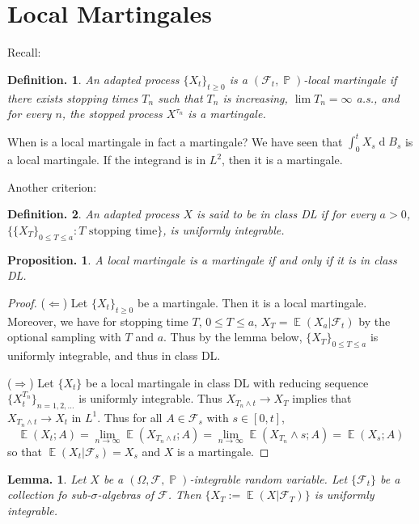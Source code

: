 \documentclass[11pt, a4paper]{memoir}
\newcommand{\impr}{{($\Longrightarrow$)\hspace{0.2cm}}}
\newcommand{\impl}{{($\Longleftarrow$)\hspace{0.2cm}}}
\theoremstyle{change}
\newtheorem{lemma}[theorem]{Lemma.}
\newtheorem{proposition}[theorem]{Proposition.}
\theoremstyle{plain}
\theoremstyle{nonumberplain}
\newtheorem{definition}{Definition.}
\newtheorem{proof}{Proof}
\DeclareMathOperator{\pr}{{\mathbb{P}}}
\DeclareMathOperator{\E}{{\mathbb{E}}}
\renewcommand{\d}[1]{\ensuremath{\operatorname{d}\!{#1}}}
\numberwithin{equation}{section}
\begin{document}
\section{Local Martingales}
Recall:
\begin{definition}
    An adapted process $\{X_t\}_{t\geq 0}$ is a $(\mathcal{F}_t,\pr)$-local martingale if there exists stopping times $T_n$ such that $T_n$ is increasing, $\lim T_n=\infty$ a.s., and for every $n$, the stopped process $X^{\tau_n}$ is a martingale.
\end{definition}
When is a local martingale in fact a martingale?
We have seen that $\int_0^t X_s\d{B_s}$ is a local martingale.
If the integrand is in $L^2$, then it is a martingale.

Another criterion:
\begin{definition}
    An adapted process $X$ is said to be in class DL if for every $a>0$, $\bigl\{\{X_T\}_{0\leq T\leq a}:T\text{ stopping time}\bigr\}$, is uniformly integrable.
\end{definition}
\begin{proposition}
    A local martingale is a martingale if and only if it is in class DL.
\end{proposition}
\begin{proof}
    \impl
    Let $\{X_t\}_{t\geq 0}$ be a martingale.
    Then it is a local martingale.
    Moreover, we have for stopping time $T$, $0\leq T\leq a$, $X_T=\E(X_a|\mathcal{F}_t)$ by the optional sampling with $T$ and $a$.
    Thus by the lemma below, $\{X_T\}_{0\leq T\leq a}$ is uniformly integrable, and thus in class DL.

    \impr
    Let $\{X_t\}$ be a local martingale in class DL with reducing sequence $\{X_t^{T_n}\}_{n=1,2,\ldots}$ is uniformly integrable.
    Thus $X_{T_n\wedge t}\to X_T$ implies that $X_{T_n\wedge t}\to X_t$ in $L^1$.
    Thus for all $A\in\mathcal{F}_s$ with $s\in[0,t]$,
    \begin{equation*}
        \E(X_t;A)=\lim_{n\to\infty}\E(X_{T_n\wedge t};A)=\lim_{n\to\infty}\E(X_{T_n}\wedge s;A)=\E(X_s;A)
    \end{equation*}
    so that $\E(X_t|\mathcal{F}_s)=X_s$ and $X$ is a martingale.
\end{proof}
\begin{lemma}
    Let $X$ be a $(\Omega,\mathcal{F},\pr)$-integrable random variable.
    Let $\{\mathcal{F}_t\}$ be a collection fo sub-$\sigma$-algebras of $\mathcal{F}$.
    Then $\{X_T:=\E(X|\mathcal{F}_T)\}$ is uniformly integrable.
\end{lemma}
\end{document}

